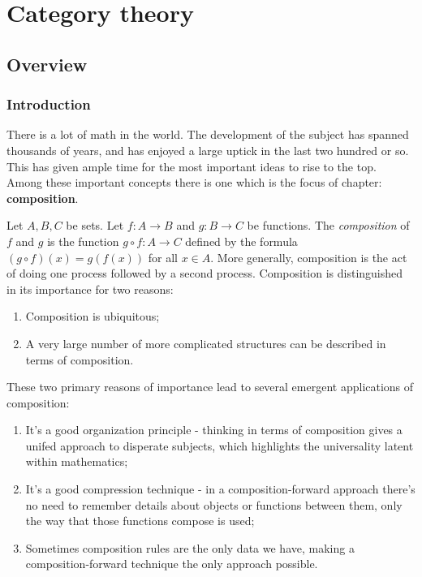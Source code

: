 
\section{Category theory}

\subsection{Overview}

\subsubsection{Introduction}

There is a lot of math in the world. The development of the subject has spanned thousands of years, and has enjoyed a large uptick in the last two hundred or so. This has given ample time for the most important ideas to rise to the top. Among these important concepts there is one which is the focus of chapter: \textbf{composition}.

Let $A,B,C$ be sets. Let $f:A\to B$ and $g:B\to C$ be functions. The \textit{composition} of $f$ and $g$ is the function $g\circ f: A\to C$ defined by the formula $(g\circ f)(x)=g(f(x))$ for all $x\in A$. More generally, composition is the act of doing one process followed by a second process. Composition is distinguished in its importance for two reasons:

\begin{enumerate}
\item Composition is ubiquitous;
\item A very large number of more complicated structures can be described in terms of composition.
\end{enumerate}

These two primary reasons of importance lead to several emergent applications of composition:

\begin{enumerate}
\item It's a good organization principle - thinking in terms of composition gives a unifed approach to disperate subjects, which highlights the universality latent within mathematics;
\item It's a good compression technique - in a composition-forward approach there's no need to remember details about objects or functions between them, only the way that those functions compose is used;
\item Sometimes composition rules are the only data we have, making a composition-forward technique the only approach possible.
\end{enumerate}

